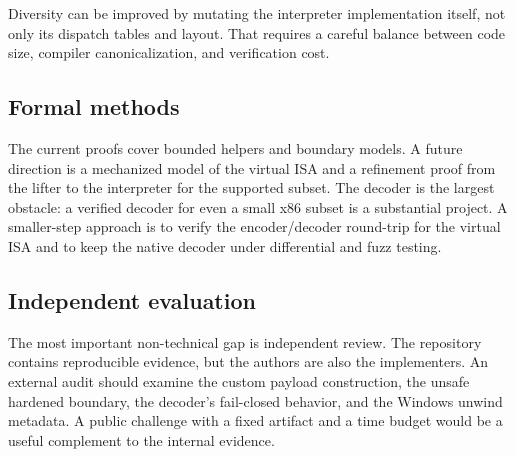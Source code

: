 Diversity can be improved by mutating the interpreter implementation itself, not
only its dispatch tables and layout. That requires a careful balance between code
size, compiler canonicalization, and verification cost.

\subsection{Formal methods}

The current proofs cover bounded helpers and boundary models. A future direction
is a mechanized model of the virtual ISA and a refinement proof from the lifter
to the interpreter for the supported subset. The decoder is the largest obstacle:
a verified decoder for even a small x86 subset is a substantial project. A
smaller-step approach is to verify the encoder/decoder round-trip for the virtual
ISA and to keep the native decoder under differential and fuzz testing.

\subsection{Independent evaluation}

The most important non-technical gap is independent review. The repository
contains reproducible evidence, but the authors are also the implementers. An
external audit should examine the custom payload construction, the unsafe
hardened boundary, the decoder's fail-closed behavior, and the Windows unwind
metadata. A public challenge with a fixed artifact and a time budget would be a
useful complement to the internal evidence.
